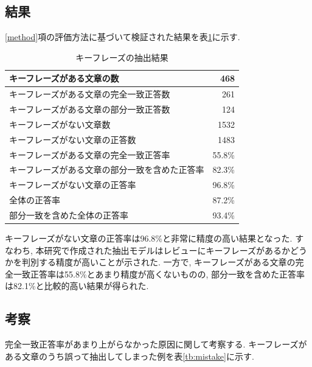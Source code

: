 \subsection{結果}
\ref{method}項の評価方法に基づいて検証された結果を表\ref{tb:qa}に示す. 

\begin{table}[H]
  \caption{キーフレーズの抽出結果}
  \small
  \label{tb:qa}
  \begin{center}
  \begin{tabularx}{\linewidth}{X|r}
    \hline
    キーフレーズがある文章の数&468\\\hline
    キーフレーズがある文章の完全一致正答数&261\\\hline
    キーフレーズがある文章の部分一致正答数&124\\\hline
    キーフレーズがない文章数&1532\\\hline
    キーフレーズがない文章の正答数&1483\\\hline\hline
    キーフレーズがある文章の完全一致正答率&55.8\%\\\hline
    キーフレーズがある文章の部分一致を含めた正答率&82.3\%\\\hline
    キーフレーズがない文章の正答率&96.8\%\\\hline\hline
    全体の正答率&87.2\%\\\hline
    部分一致を含めた全体の正答率&93.4\%\\\hline
  \end{tabularx}\end{center}
\end{table}

キーフレーズがない文章の正答率は96.8\%と非常に精度の高い結果となった. すなわち, 本研究で作成された抽出モデルはレビューにキーフレーズがあるかどうかを判別する精度が高いことが示された. 
一方で, キーフレーズがある文章の完全一致正答率は55.8\%とあまり精度が高くないものの, 部分一致を含めた正答率は82.1\%と比較的高い結果が得られた. 

\subsection{考察}
完全一致正答率があまり上がらなかった原因に関して考察する. 
キーフレーズがある文章のうち誤って抽出してしまった例を表\ref{tb:mistake}に示す.

